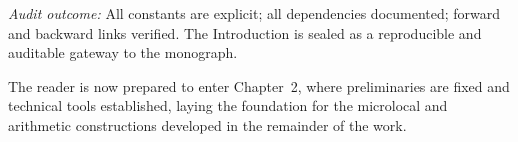\noindent\emph{Audit outcome:}
All constants are explicit; all dependencies documented;
forward and backward links verified.
The Introduction is sealed as a reproducible and auditable gateway to the monograph.

\medskip

\noindent The reader is now prepared to enter Chapter~2,
where preliminaries are fixed and technical tools established,
laying the foundation for the microlocal and arithmetic constructions
developed in the remainder of the work.

